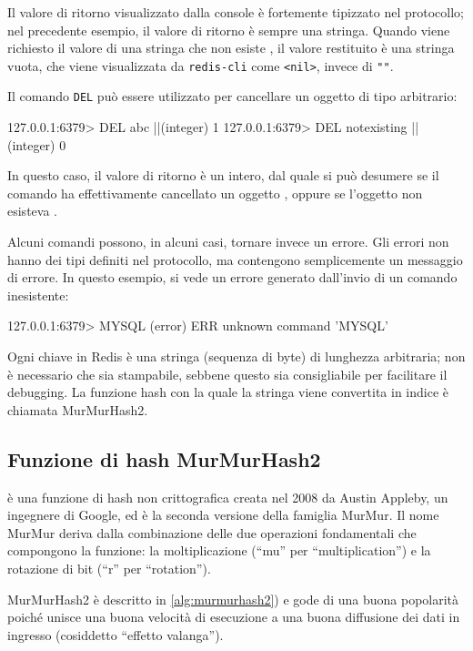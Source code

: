 Il valore di ritorno visualizzato dalla console è fortemente tipizzato nel protocollo;
nel precedente esempio, il valore di ritorno è sempre una stringa. Quando viene
richiesto il valore di una stringa che non esiste , il valore restituito
è una stringa vuota, che viene visualizzata da \verb|redis-cli| come \verb|<nil>|,
invece di \verb|""|.

Il comando \verb|DEL| può essere utilizzato per cancellare un oggetto di tipo
arbitrario:

\begin{commentedsource}[style=redis]
127.0.0.1:6379> DEL abc
|\lnote|(integer) 1
127.0.0.1:6379> DEL notexisting
|\lnote|(integer) 0
\end{commentedsource}

In questo caso, il valore di ritorno è un intero, dal quale si può desumere se il comando ha
effettivamente cancellato un oggetto , oppure se l'oggetto non esisteva .

Alcuni comandi possono, in alcuni casi, tornare invece un errore. Gli errori non hanno dei
tipi definiti nel protocollo, ma contengono semplicemente un messaggio di errore. In questo
esempio, si vede un errore generato dall'invio di un comando inesistente:

\begin{commentedsource}[style=redis]
127.0.0.1:6379> MYSQL
(error) ERR unknown command 'MYSQL'
\end{commentedsource}

Ogni chiave in Redis è una stringa (sequenza di byte) di lunghezza arbitraria; non è
necessario che sia stampabile, sebbene questo sia consigliabile per facilitare il
debugging. La funzione hash con la quale la stringa viene convertita in indice è
chiamata MurMurHash2.

\subsection{Funzione di hash MurMurHash2}
\label{sec:redis:murmur}

 è una funzione di hash non
crittografica creata nel 2008 da Austin Appleby, un ingegnere di Google, ed è la seconda versione
della famiglia MurMur. Il nome MurMur deriva dalla combinazione delle due operazioni fondamentali
che compongono la funzione: la moltiplicazione (``mu'' per ``multiplication'') e la rotazione di bit
(``r'' per ``rotation'').

MurMurHash2 è descritto in \autoref{alg:murmurhash2}) e gode di una buona popolarità poiché unisce
una buona velocità di esecuzione a una buona diffusione dei dati in ingresso (cosiddetto ``effetto
valanga'').

